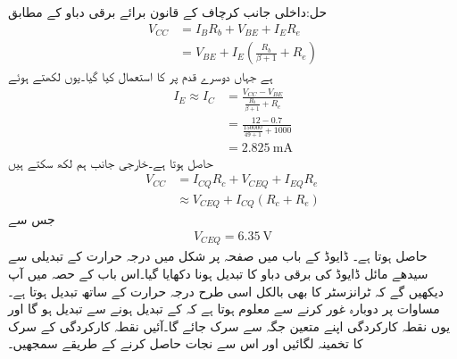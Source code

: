 حل:داخلی جانب کرچاف کے قانون برائے برقی دباو کے مطابق
\begin{align*}
V_{CC}&=I_B R_b+V_{BE}+I_E R_e\\
&=V_{BE}+I_E \left(\frac{R_b}{\beta+1}+R_e \right)
\end{align*}
ہے جہاں دوسرے قدم پر  کا استعمال کیا گیا۔یوں  لکھتے ہوئے
\begin{align*}
I_E \approx I_C &= \frac{V_{CC}-V_{BE}}{\frac{R_b}{\beta+1}+R_e}\\
&=\frac{12-0.7}{\frac{150000}{49+1}+1000}\\
&=\SI{2.825}{\milli \ampere}
\end{align*}
حاصل ہوتا ہے۔خارجی جانب ہم لکھ سکتے  ہیں
\begin{align*}
V_{CC}&=I_{CQ} R_c+V_{CEQ}+I_{EQ} R_e\\
&\approx V_{CEQ}+I_{CQ} \left(R_c+R_e \right)
\end{align*}
جس سے
\begin{align*}
V_{CEQ}=\SI{6.35}{\volt}
\end{align*}
حاصل ہوتا ہے۔
  \label{حصہ_تبدیلی_برقی_دباو_سے_نکتہ_کارکردگی_کا_سرک_جانا}
ڈایوڈ کے باب میں صفحہ  \pageref{شکل_برقی_دباو_بالمقابل_حرارت}  پر شکل   میں درجہ حرارت کے تبدیلی سے سیدھے مائل ڈایوڈ کی برقی دباو   کا تبدیل ہونا دکھایا گیا۔اس باب کے حصہ  میں آپ دیکھیں گے کہ ٹرانزسٹر کا   بھی بالکل اسی طرح درجہ حرارت کے ساتھ تبدیل ہوتا ہے۔مساوات   پر دوبارہ غور کرنے سے معلوم ہوتا ہے کہ  کے تبدیل ہونے سے   تبدیل ہو گا اور یوں نقطہ کارکردگی اپنے متعین جگہ سے سرک جائے گا۔آئیں نقطہ کارکردگی کے سرک کا تخمینہ لگائیں اور اس سے نجات حاصل کرنے کے طریقے سمجھیں۔

